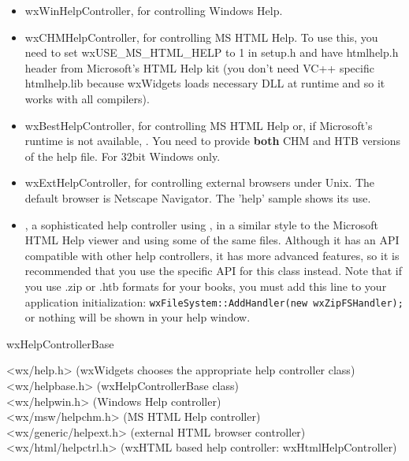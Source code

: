 \begin{itemize}\itemsep=0pt
\item wxWinHelpController, for controlling Windows Help.
\item wxCHMHelpController, for controlling MS HTML Help. To use this, you need to set wxUSE\_MS\_HTML\_HELP
to 1 in setup.h and have htmlhelp.h header from Microsoft's HTML Help kit (you don't need
VC++ specific htmlhelp.lib because wxWidgets loads necessary DLL at runtime and so it
works with all compilers).
\item wxBestHelpController, for controlling MS HTML Help or, if Microsoft's runtime is
not available, . You need to provide
{\bf both} CHM and HTB versions of the help file. For 32bit Windows only.
\item wxExtHelpController, for controlling external browsers under Unix.
The default browser is Netscape Navigator. The 'help' sample shows its use.
\item {}, a sophisticated help controller using , in
a similar style to the Microsoft HTML Help viewer and using some of the same files.
Although it has an API compatible with other help controllers, it has more advanced features, so it is
recommended that you use the specific API for this class instead. Note that if you
use .zip or .htb formats for your books, you
must add this line to your application initialization: {\tt wxFileSystem::AddHandler(new wxZipFSHandler);}
or nothing will be shown in your help window.
\end{itemize}


wxHelpControllerBase\\


<wx/help.h> (wxWidgets chooses the appropriate help controller class)\\
<wx/helpbase.h> (wxHelpControllerBase class)\\
<wx/helpwin.h> (Windows Help controller)\\
<wx/msw/helpchm.h> (MS HTML Help controller)\\
<wx/generic/helpext.h> (external HTML browser controller)\\
<wx/html/helpctrl.h> (wxHTML based help controller: wxHtmlHelpController)


